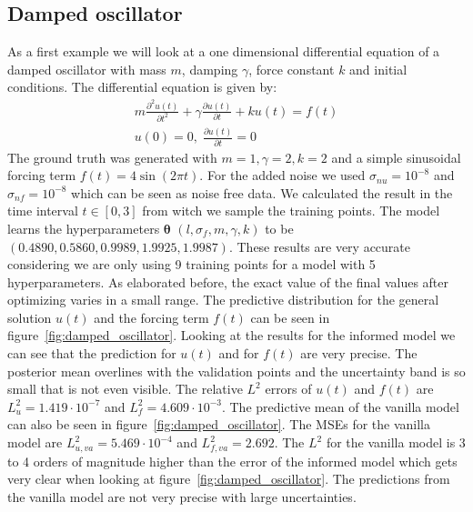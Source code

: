 \documentclass{article}
\begin{document}
\subsection{Damped oscillator}
As a first example we will look at a one dimensional differential equation of a
damped oscillator with mass $m$, damping $\gamma$, force constant $k$ and initial conditions. The
differential equation is given by:
\begin{equation}
    \begin{aligned}
        m\frac{\partial^2 u(t)}{\partial t^2} + \gamma \frac{\partial u(t)}{\partial t} + k u(t) = f(t) \\ u(0) = 0, \; \frac{\partial u(t)}{\partial t} = 0
    \end{aligned}
\end{equation}
The ground truth was generated with $m = 1, \gamma = 2, k = 2$ and a simple sinusoidal forcing term $f(t) = 4 \sin(2\pi t)$. For the added noise we used $\sigma_{nu} = 10^{-8}$ and $\sigma_{nf} = 10^{-8}$ which can be seen as noise free data. We calculated the result in the time interval $t \in [0,3]$ from witch we sample the training points. The model learns the hyperparameters $\bm{\theta}$ $(l,\sigma_f,m,\gamma,k)$ to be $(0.4890, 0.5860, 0.9989, 1.9925, 1.9987)$. These results are very accurate considering we are only using 9 training points for a model with 5 hyperparameters. As elaborated before, the exact value of the final values after optimizing varies in a small range. The predictive distribution for the general solution $u(t)$ and the forcing term $f(t)$ can be seen in figure~\ref{fig:damped_oscillator}. Looking at the results for the informed model we can see that the prediction for $u(t)$ and for $f(t)$ are very precise. The posterior mean overlines with the validation points and the uncertainty band is so small that is not even visible. The relative $L^2$ errors of $u(t)$ and $f(t)$ are $L^2_u = 1.419 \cdot 10^{-7}$ and $L^2_f = 4.609 \cdot 10^{-3}$. The predictive mean of the vanilla model can also be seen in figure~\ref{fig:damped_oscillator}. The MSEs for the vanilla model are $L^2_{u,va} = 5.469 \cdot 10^{-4}$ and $L^2_{f,va} = 2.692$. The $L^2$ for the vanilla model is 3 to 4 orders of magnitude higher than the error of the informed model which gets very clear when looking at figure~\ref{fig:damped_oscillator}. The predictions from the vanilla model are not very precise with large uncertainties. %
\end{document}
